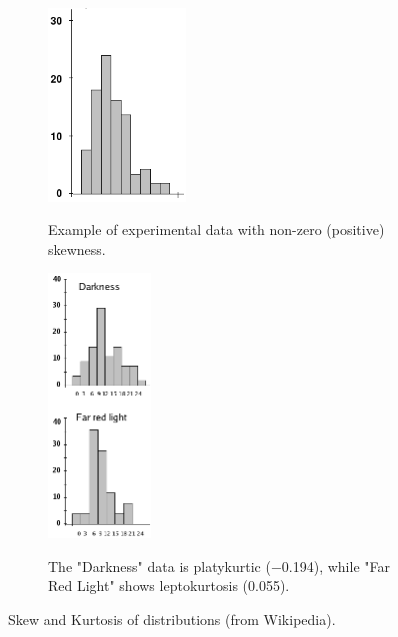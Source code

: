 \begin{figure}
\centering
\begin{subfigure}{.5\textwidth}
  \centering
  \includegraphics[width=0.4\textwidth]{../Images/SkewedDistribution.png}\\
  \caption{Example of experimental data with non-zero (positive) skewness.}
  \label{fig:skewness}
  \end{subfigure}%
\begin{subfigure}{.5\textwidth}
  \centering
\includegraphics[width=0.3\textwidth]{../Images/KurtosisChanges.png}\\
  \caption{The "Darkness" data is platykurtic (−0.194), while "Far Red Light" shows leptokurtosis (0.055).}
  \label{fig:kurtosis}
  \end{subfigure}
\caption{Skew and Kurtosis of distributions (from Wikipedia).}
\label{fig:skewkurtosis}
\end{figure}


